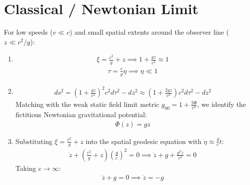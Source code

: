 \documentclass[letterpaper,10pt,english]{jupyterBook}
\begin{document}
\section{Classical / Newtonian Limit}
\label{\detokenize{ch/relativity-special/rindler:classical-newtonian-limit}}
\sphinxAtStartPar
For low speeds (\(v \ll c\)) and small spatial extents around the observer line (\(z \ll c^2/g\)):
\begin{enumerate}
%
\item {} 
\sphinxAtStartPar
{}
\begin{equation*}
\begin{split}\xi = \frac{c^2}{g} + z \implies 1 + \frac{gz}{c^2} \approx 1\end{split}
\end{equation*}\begin{equation*}
\begin{split}\tau = \frac{c}{g} \eta \implies \eta \ll 1\end{split}
\end{equation*}
\item {} 
\sphinxAtStartPar
{}
\begin{equation*}
\begin{split}ds^2 = \left(1 + \frac{gz}{c^2}\right)^2 c^2 d\tau^2 - dz^2 \approx \left(1 + \frac{2gz}{c^2}\right) c^2 d\tau^2 - dz^2\end{split}
\end{equation*}
\sphinxAtStartPar
Matching with the weak static field limit metric \(g_{00} = 1 + \frac{2\Phi}{c^2}\), we identify the fictitious Newtonian gravitational potential:
\begin{equation*}
\begin{split}\Phi(z) = g z\end{split}
\end{equation*}
\item {} 
\sphinxAtStartPar
{}
Substituting \(\xi = \frac{c^2}{g} + z\) into the spatial geodesic equation with \(\dot{\eta} \approx \frac{g}{c} \dot{t}\):
\begin{equation*}
\begin{split}\ddot{z} + \left(\frac{c^2}{g} + z\right) \left(\frac{g}{c}\right)^2 = 0 \implies \ddot{z} + g + \frac{g^2 z}{c^2} = 0\end{split}
\end{equation*}
\sphinxAtStartPar
Taking \(c \to \infty\):
\begin{equation*}
\begin{split}\ddot{z} + g = 0 \implies \ddot{z} = -g\end{split}
\end{equation*}
\end{enumerate}
\end{document}
